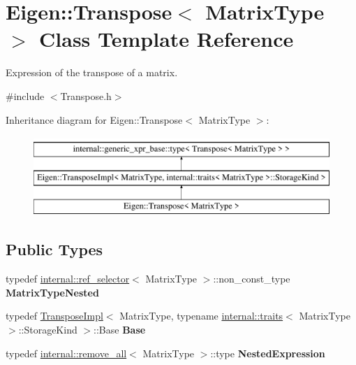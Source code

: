 \hypertarget{class_eigen_1_1_transpose}{}\section{Eigen\+::Transpose$<$ Matrix\+Type $>$ Class Template Reference}
\label{class_eigen_1_1_transpose}


Expression of the transpose of a matrix.  




{\ttfamily \#include $<$Transpose.\+h$>$}

Inheritance diagram for Eigen\+::Transpose$<$ Matrix\+Type $>$\+:\begin{figure}[H]
\begin{center}
\leavevmode
\includegraphics[height=3.000000cm]{class_eigen_1_1_transpose}
\end{center}
\end{figure}
\subsection*{Public Types}
\begin{DoxyCompactItemize}
\item 
\mbox{\label{class_eigen_1_1_transpose_ae5ed6d63c0030faf63214011f4c6e92e}} 
typedef \mbox{\hyperlink{struct_eigen_1_1internal_1_1ref__selector}{internal\+::ref\+\_\+selector}}$<$ Matrix\+Type $>$\+::non\+\_\+const\+\_\+type {\bfseries Matrix\+Type\+Nested}
\item 
\mbox{\label{class_eigen_1_1_transpose_a5b3e9a3e042dcc01657dfcd5277ccf4f}} 
typedef \mbox{\hyperlink{class_eigen_1_1_transpose_impl}{Transpose\+Impl}}$<$ Matrix\+Type, typename \mbox{\hyperlink{struct_eigen_1_1internal_1_1traits}{internal\+::traits}}$<$ Matrix\+Type $>$\+::Storage\+Kind $>$\+::Base {\bfseries Base}
\item 
\mbox{\label{class_eigen_1_1_transpose_ad647d12ef19ec62e9c549b162e2d55c3}} 
typedef \mbox{\hyperlink{struct_eigen_1_1internal_1_1remove__all}{internal\+::remove\+\_\+all}}$<$ Matrix\+Type $>$\+::type {\bfseries Nested\+Expression}
\end{DoxyCompactItemize}
